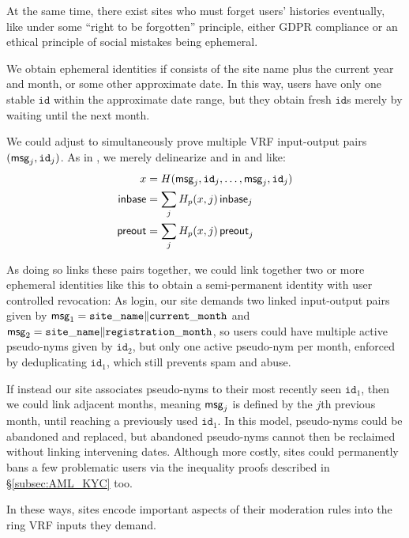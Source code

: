 At the same time, there exist sites who must forget users' histories
eventually, like under some ``right to be forgotten'' principle, either
GDPR compliance or an ethical principle of social mistakes being ephemeral.

We obtain ephemeral identities if \msg consists of the site name plus
the current year and month, or some other approximate date.
In this way, users have only one stable $\mathtt{id}$ within the
approximate date range, but they obtain fresh $\mathtt{id}$s merely
by waiting until the next month.

We could adjust \PedVRF to simultaneously prove multiple VRF input-output
pairs $(\mathsf{msg}_j,\mathtt{id}_j)$.
As in \cite{PrivacyPass}, we merely delinearize \In and \PreOut in
\rSign and \rVerify like:
\begin{align*}
x &= H(\mathsf{msg}_j,\mathtt{id}_j,\ldots,\mathsf{msg}_j,\mathtt{id}_j) \\
{\mathsf{inbase}} &= \sum_j H_p(x,j) \, {\mathsf{inbase}}_j \\
{\mathsf{preout}} &= \sum_j H_p(x,j) \, {\mathsf{preout}}_j \\
\end{align*}

As doing so links these pairs together,
we could link together two or more ephemeral identities like this
to obtain a semi-permanent identity with user controlled revocation:
As login, our site demands two linked input-output pairs given by
 $\mathsf{msg}_1 = \mathtt{site\_name} \| \mathtt{current\_month}$ and
 $\mathsf{msg}_2 = \mathtt{site\_name} \| \mathtt{registration\_month}$,
so users could have multiple active pseudo-nyms given by $\mathtt{id}_2$,
but only one active pseudo-nym per month, enforced by deduplicating
 $\mathtt{id}_1$, which still prevents spam and abuse.

If instead our site associates pseudo-nyms to their most recently seen
$\mathtt{id}_1$, then we could link adjacent months, meaning $\mathsf{msg}_j$
is defined by the $j$th previous month, until reaching a previously used $\mathtt{id}_1$.
In this model, pseudo-nyms could be abandoned and replaced, but
abandoned pseudo-nyms cannot then be reclaimed without linking intervening dates.
Although more costly, sites could permanently bans a few problematic
users via the inequality proofs described in \S\ref{subsec:AML_KYC} too.

In these ways, sites encode important aspects of their moderation rules
into the ring VRF inputs they demand.  


